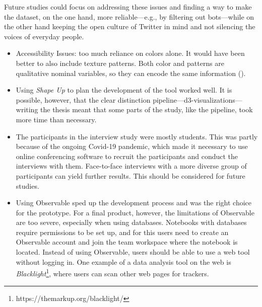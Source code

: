 Future studies could focus on addressing these issues and finding a way to make the dataset, on the one hand, more reliable---e.g., by filtering out bots---while on the other hand keeping the open culture of Twitter in mind and not silencing the voices of everyday people.

\begin{itemize}
    \item Accessibility Issues: too much reliance on colors alone. It would have been better to also include texture patterns. Both color and patterns are qualitative nominal variables, so they can encode the same information (\cite[1860]{bornerDataVisualizationLiteracy2019}).
    \item Using \emph{Shape Up} to plan the development of the tool worked well. It is possible, however, that the clear distinction pipeline---d3-visualizations---writing the thesis meant that some parts of the study, like the pipeline, took more time than necessary.
    \item The participants in the interview study were mostly students. This was partly because of the ongoing Covid-19 pandemic, which made it necessary to use online conferencing software to recruit the participants and conduct the interviews with them. Face-to-face interviews with a more diverse group of participants can yield further results. This should be considered for future studies.
    \item Using Observable sped up the development process and was the right choice for the prototype. For a final product, however, the limitations of Observable are too severe, especially when using databases. Notebooks with databases require permissions to be set up, and for this users need to create an Observable account and join the team workspace where the notebook is located. Instead of using Observable, users should be able to use a web tool without logging in. One example of a data analysis tool on the web is \emph{Blacklight}\footnote{https://themarkup.org/blacklight/}, where users can scan other web pages for trackers.

\end{itemize}
